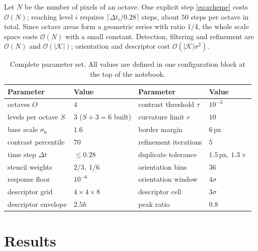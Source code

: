 \documentclass[11pt,a4paper]{article}
\begin{document}
Let $N$ be the number of pixels of an octave. One explicit step
\eqref{eq:scheme} costs $\mathcal{O}(N)$; reaching level $i$ requires
$\lceil\Delta t_i/0.28\rceil$ steps, about $50$ steps per octave in total.
Since octave areas form a geometric series with ratio $1/4$, the whole scale
space costs $\mathcal{O}(N)$ with a small constant. Detection, filtering and
refinement are $\mathcal{O}(N)$ and $\mathcal{O}(|\mathcal{K}|)$; orientation
and descriptor cost $\mathcal{O}(|\mathcal{K}|\sigma^2)$.

\begin{table}[ht]
\centering
\small
\begin{tabular}{@{}llll@{}}
\toprule
Parameter & Value & Parameter & Value \\
\midrule
octaves $O$                 & $4$        & contrast threshold $\tau$      & $10^{-3}$ \\
levels per octave $S$       & $3$ ($S{+}3=6$ built) & curvature limit $r$ & $10$ \\
base scale $\sigma_0$       & $1.6$      & border margin                  & $6$\,px \\
contrast percentile         & $70$       & refinement iterations          & $5$ \\
time step $\Delta t$        & $\le0.28$  & duplicate tolerance            & $1.5$\,px, $1.3\times$ \\
stencil weights             & $2/3,\ 1/6$& orientation bins               & $36$ \\
response floor              & $10^{-6}$  & orientation window             & $4\sigma$ \\
descriptor grid             & $4\times4\times8$ & descriptor cell         & $3\sigma$ \\
descriptor envelope         & $2.5h$     & peak ratio                     & $0.8$ \\
\bottomrule
\end{tabular}
\caption{Complete parameter set. All values are defined in one configuration
block at the top of the notebook.}
\label{tab:params}
\end{table}

\section{Results}
\end{document}
